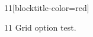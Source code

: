 \documentclass[paper=A4]{ropas-poster}
\begin{document}
\begin{postergrid}{1}{1}[blocktitle-color=red]
\begin{posterblock}{1}{1}
Grid option test.
\end{posterblock}
\end{postergrid}
\end{document}
